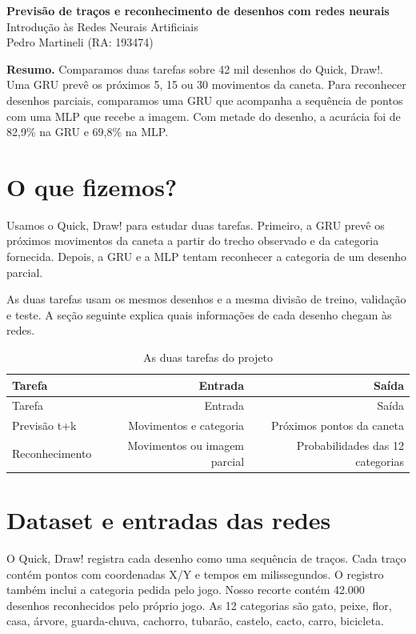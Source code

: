 \documentclass[11pt,a4paper]{article}
\begin{document}
\begin{center}{\Large\bfseries\color{ink} Previsão de traços e reconhecimento de desenhos com redes neurais}\\[5pt]
Introdução às Redes Neurais Artificiais\\Pedro Martineli (RA: 193474)
\end{center}\textbf{Resumo.} Comparamos duas tarefas sobre 42 mil desenhos do Quick, Draw!. Uma GRU prevê os próximos 5, 15 ou 30 movimentos da caneta. Para reconhecer desenhos parciais, comparamos uma GRU que acompanha a sequência de pontos com uma MLP que recebe a imagem. Com metade do desenho, a acurácia foi de 82,9\% na GRU e 69,8\% na MLP.
\section*{O que fizemos?}
Usamos o Quick, Draw! para estudar duas tarefas. Primeiro, a GRU prevê os próximos movimentos da caneta a partir do trecho observado e da categoria fornecida. Depois, a GRU e a MLP tentam reconhecer a categoria de um desenho parcial.

As duas tarefas usam os mesmos desenhos e a mesma divisão de treino, validação e teste. A seção seguinte explica quais informações de cada desenho chegam às redes.
\begingroup\small\setlength{\tabcolsep}{4pt}\begin{longtable}{lrr}
\caption{As duas tarefas do projeto}\\
\toprule
Tarefa & Entrada & Saída \\
\midrule\endfirsthead
\toprule
Tarefa & Entrada & Saída \\
\midrule\endhead
\bottomrule\endfoot
Previsão t+k & Movimentos e categoria & Próximos pontos da caneta \\
Reconhecimento & Movimentos ou imagem parcial & Probabilidades das 12 categorias \\
\end{longtable}\endgroup
\clearpage
\section*{Dataset e entradas das redes}
O Quick, Draw! registra cada desenho como uma sequência de traços. Cada traço contém pontos com coordenadas X/Y e tempos em milissegundos. O registro também inclui a categoria pedida pelo jogo. Nosso recorte contém 42.000 desenhos reconhecidos pelo próprio jogo. As 12 categorias são gato, peixe, flor, casa, árvore, guarda-chuva, cachorro, tubarão, castelo, cacto, carro, bicicleta.
\end{document}
